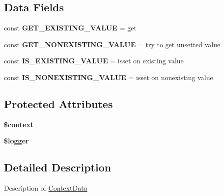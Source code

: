 \subsection*{Data Fields}
\begin{DoxyCompactItemize}
\item 
\mbox{\label{class_pes_1_1_type_1_1_context_data_a916e8cc332129f14532ad11e802df101}} 
const {\bfseries G\+E\+T\+\_\+\+E\+X\+I\+S\+T\+I\+N\+G\+\_\+\+V\+A\+L\+UE} = \textquotesingle{}get\textquotesingle{}
\item 
\mbox{\label{class_pes_1_1_type_1_1_context_data_a26146027e2819631428f6d55e0542eea}} 
const {\bfseries G\+E\+T\+\_\+\+N\+O\+N\+E\+X\+I\+S\+T\+I\+N\+G\+\_\+\+V\+A\+L\+UE} = \textquotesingle{}try to get unsetted value\textquotesingle{}
\item 
\mbox{\label{class_pes_1_1_type_1_1_context_data_a11f2356644b93bb49e7091e9aeb51efa}} 
const {\bfseries I\+S\+\_\+\+E\+X\+I\+S\+T\+I\+N\+G\+\_\+\+V\+A\+L\+UE} = \textquotesingle{}isset on existing value\textquotesingle{}
\item 
\mbox{\label{class_pes_1_1_type_1_1_context_data_af157df6e106ed442e3f292abe3397a17}} 
const {\bfseries I\+S\+\_\+\+N\+O\+N\+E\+X\+I\+S\+T\+I\+N\+G\+\_\+\+V\+A\+L\+UE} = \textquotesingle{}isset on nonexisting value\textquotesingle{}
\end{DoxyCompactItemize}
\subsection*{Protected Attributes}
\begin{DoxyCompactItemize}
\item 
\mbox{\label{class_pes_1_1_type_1_1_context_data_ae05dedb802ada0155efdece2044fed64}} 
{\bfseries \$context}
\item 
\mbox{\label{class_pes_1_1_type_1_1_context_data_aebfec76216371ef236acc5910e90933d}} 
{\bfseries \$logger}
\end{DoxyCompactItemize}


\subsection{Detailed Description}
Description of \mbox{\hyperlink{class_pes_1_1_type_1_1_context_data}{Context\+Data}}

